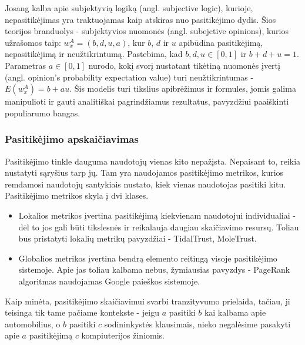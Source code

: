 \documentclass{VUMIFInfMagistrinis}
\begin{document}
\newline
\indent
Josang \cite{18} kalba apie subjektyvią logiką (angl. subjective logic), kurioje, nepasitikėjimas yra traktuojamas kaip atskiras nuo pasitikėjimo dydis. Šios teorijos branduolys - subjektyvios nuomonės (angl. subejctive opinions), kurios užrašomos taip: $w_{x}^{A} = (b,d,u,a)$, kur $b$, $d$ ir $u$ apibūdina pasitikėjimą, nepasitikėjimą ir neužtikrintumą. Pastebima, kad $b,d,u \in [0,1]$ ir $b+d+u=1$. Parametras $a \in [0,1]$ nurodo, kokį svorį nustatant tikėtiną nuomonės įvertį (angl. opinion's probability expectation value) turi neužtikrintumas - $E(w_x^A)=b+au$. Šis modelis turi tikslius apibrėžimus ir formules, jomis galima manipulioti ir gauti analitiškai pagrindžiamus rezultatus, pavyzdžiui paaiškinti populiarumo bangas. 
\subsubsection{Pasitikėjimo apskaičiavimas}\label{ssec:trust}
Pasitikėjimo tinkle dauguma naudotojų vienas kito nepažįsta. Nepaisant to, reikia nustatyti sąryšius tarp jų. Tam yra naudojamos pasitikėjimo metrikos, kurios remdamosi naudotojų santykiais nustato, kiek vienas naudotojas pasitiki kitu. Pasitikėjimo metrikos skyla į dvi klases.
\begin{itemize}
	\item Lokalios metrikos įvertina pasitikėjimą kiekvienam naudotojui individualiai - dėl to jos gali būti tikslesnės ir reikalauja daugiau skaičiavimo resursų. Toliau bus pristatyti lokalių metrikų pavyzdžiai - TidalTrust, MoleTrust.
	\item Globalios metrikos įvertina bendrą elemento reitingą visoje pasitikėjimo sistemoje. Apie jas toliau kalbama nebus, žymiausias pavyzdys - PageRank algoritmas naudojamas Google paieškos sistemoje.
\end{itemize}
Kaip minėta, pasitikėjimo skaičiavimui svarbi tranzityvumo prielaida, tačiau, ji teisinga tik tame pačiame kontekste - jeigu $a$ pasitiki $b$ kai kalbama apie automobilius, o $b$ pasitiki $c$ sodininkystės klausimais, nieko negalėsime pasakyti apie $a$ pasitikėjimą $c$ kompiuterijos žiniomis.
\end{document}
